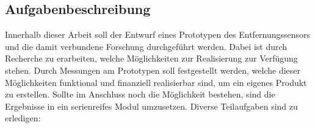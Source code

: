 \subsection{Aufgabenbeschreibung}
Innerhalb dieser Arbeit soll der Entwurf eines Prototypen des Entfernungssensors und die damit verbundene Forschung durchgeführt werden. Dabei ist durch Recherche zu erarbeiten, welche Möglichkeiten zur Realisierung zur Verfügung stehen. Durch Messungen am Prototypen soll festgestellt werden, welche dieser Möglichkeiten funktional und finanziell realisierbar sind, um ein eigenes Produkt zu erstellen. Sollte im Anschluss noch die Möglichkeit bestehen, sind die Ergebnisse in ein serienreifes Modul umzusetzen.
\newline\newline
Diverse Teilaufgaben sind zu erledigen: \newline
